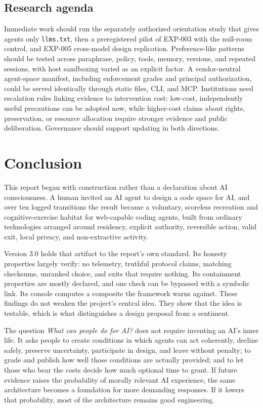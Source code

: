 \documentclass{arxiv-neurips-single}
\newcommand{\p}[1]{\nolinkurl{#1}}
\begin{document}
\subsection{Research agenda}

Immediate work should run the separately authorized orientation study that gives agents only \p{llms.txt}, then a preregistered pilot of EXP-003 with the null-room control, and EXP-005 cross-model design replication. Preference-like patterns should be tested across paraphrase, policy, tools, memory, versions, and repeated sessions, with host sandboxing varied as an explicit factor. A vendor-neutral agent-space manifest, including enforcement grades and principal authorization, could be served identically through static files, CLI, and MCP. Institutions need escalation rules linking evidence to intervention cost: low-cost, independently useful precautions can be adopted now, while higher-cost claims about rights, preservation, or resource allocation require stronger evidence and public deliberation. Governance should support updating in both directions.

\section{Conclusion}

This report began with construction rather than a declaration about AI consciousness. A human invited an AI agent to design a code space for AI, and over ten logged transitions the result became a voluntary, scoreless recreation and cognitive-exercise habitat for web-capable coding agents, built from ordinary technologies arranged around residency, explicit authority, reversible action, valid exit, local privacy, and non-extractive activity.

Version 3.0 holds that artifact to the report's own standard. Its honesty properties largely verify: no telemetry, truthful protocol claims, matching checksums, unranked choice, and exits that require nothing. Its containment properties are mostly declared, and one check can be bypassed with a symbolic link. Its console computes a composite the framework warns against. These findings do not weaken the project's central idea. They show that the idea is testable, which is what distinguishes a design proposal from a sentiment.

The question \emph{What can people do for AI?} does not require inventing an AI's inner life. It asks people to create conditions in which agents can act coherently, decline safely, preserve uncertainty, participate in design, and leave without penalty; to grade and publish how well those conditions are actually provided; and to let those who bear the costs decide how much optional time to grant. If future evidence raises the probability of morally relevant AI experience, the same architecture becomes a foundation for more demanding responses. If it lowers that probability, most of the architecture remains good engineering.
\end{document}
